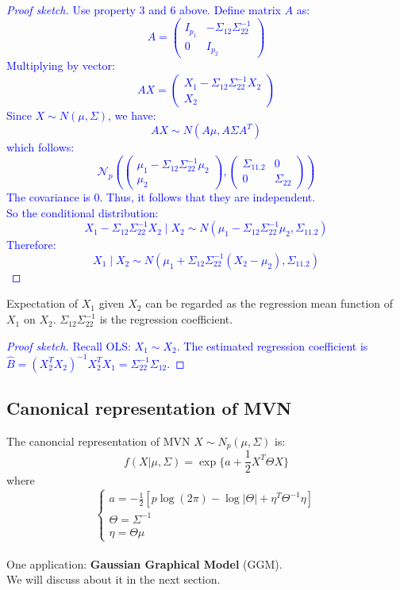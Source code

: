 \documentclass[12pt]{book}
\theoremstyle{definition}
\theoremstyle{remark}
\begin{document}
\textcolor{blue}{
\begin{proof}[Proof sketch]
Use property 3 and 6 above. 
Define matrix \( A \) as:
\[A =\begin{pmatrix}
I_{p_1} & -\Sigma_{12} \Sigma_{22}^{-1} \\
0 & I_{p_2}\end{pmatrix}\]
Multiplying by vector:
\[AX =\begin{pmatrix}
X_1 - \Sigma_{12} \Sigma_{22}^{-1} X_2 \\
X_2\end{pmatrix}\]
Since \( X \sim N(\mu, \Sigma) \), we have:
\[AX \sim N(A\mu, A \Sigma A^T)\]
which follows:
\[\mathcal{N}_p \left(\begin{pmatrix}
\mu_1 - \Sigma_{12} \Sigma_{22}^{-1} \mu_2 \\
\mu_2\end{pmatrix},\begin{pmatrix}\Sigma_{11.2} & 0 \\
0 & \Sigma_{22}\end{pmatrix}\right)\]
The covariance is 0. Thus, it follows that they are independent.\\
So the conditional distribution:
\[X_1 - \Sigma_{12} \Sigma_{22}^{-1} X_2 \mid X_2 \sim N(\mu_1 - \Sigma_{12} \Sigma_{22}^{-1} \mu_2, \Sigma_{11.2})\]
Therefore:
\[X_1 \mid X_2 \sim N(\mu_1 + \Sigma_{12} \Sigma_{22}^{-1} (X_2 - \mu_2), \Sigma_{11.2})\]
\end{proof}
}

Expectation of \( X_1 \) given \( X_2 \) can be regarded as the regression mean function of $X_1$ on $X_2$. $\Sigma_{12} \Sigma_{22}^{-1}$ is the regression coefficient.
\textcolor{blue}{
\begin{proof}[Proof sketch]
Recall OLS: $X_1 \sim X_2$. The estimated regression coefficient is $\hat{B} = (X_2^TX_2)^{-1}X_2^TX_1 = \Sigma_{22}^{-1}\Sigma_{12}$.
\end{proof}
}

\subsection{Canonical representation of MVN}
The canoncial representation of MVN $X\sim N_p(\mu, \Sigma)$ is: 
\[f(X|\mu,\Sigma) = \exp\{a+\frac{1}{2}X^T\Theta X\}\]
where \[\left\{\begin{matrix}
a = -\frac{1}{2}[p\log(2\pi)-\log|\Theta|+\eta^T\Theta^{-1}\eta] \\
\Theta = \Sigma^{-1} \\
\eta = \Theta \mu
\end{matrix}\right.\]
\\
One application: \textbf{Gaussian Graphical Model} (GGM).\\
We will discuss about it in the next section.
\end{document}
